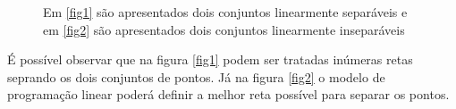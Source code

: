 \begin{figure}
\centering
{}
\qquad
{}
\label{img:linear_sepa}
\caption{Em \ref{fig1} são apresentados dois conjuntos linearmente separáveis e em \ref{fig2} são apresentados dois conjuntos linearmente inseparáveis}
\end{figure}

É possível observar que na figura \ref{fig1} podem ser tratadas inúmeras retas seprando os dois conjuntos de pontos. Já na figura \ref{fig2} o modelo de programação linear poderá definir a melhor reta possível para separar os pontos.

